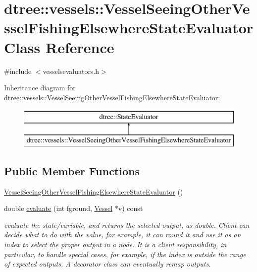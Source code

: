 \hypertarget{classdtree_1_1vessels_1_1_vessel_seeing_other_vessel_fishing_elsewhere_state_evaluator}{}\section{dtree\+::vessels\+::Vessel\+Seeing\+Other\+Vessel\+Fishing\+Elsewhere\+State\+Evaluator Class Reference}
\label{classdtree_1_1vessels_1_1_vessel_seeing_other_vessel_fishing_elsewhere_state_evaluator}


{\ttfamily \#include $<$vesselsevaluators.\+h$>$}

Inheritance diagram for dtree\+::vessels\+::Vessel\+Seeing\+Other\+Vessel\+Fishing\+Elsewhere\+State\+Evaluator\+:\begin{figure}[H]
\begin{center}
\leavevmode
\includegraphics[height=2.000000cm]{d0/d7b/classdtree_1_1vessels_1_1_vessel_seeing_other_vessel_fishing_elsewhere_state_evaluator}
\end{center}
\end{figure}
\subsection*{Public Member Functions}
\begin{DoxyCompactItemize}
\item 
\mbox{\hyperlink{classdtree_1_1vessels_1_1_vessel_seeing_other_vessel_fishing_elsewhere_state_evaluator_a5636c278d5ad17162b85049aa9da2dba}{Vessel\+Seeing\+Other\+Vessel\+Fishing\+Elsewhere\+State\+Evaluator}} ()
\item 
double \mbox{\hyperlink{classdtree_1_1vessels_1_1_vessel_seeing_other_vessel_fishing_elsewhere_state_evaluator_a76fa5431cd08865992d55357684cd7a2}{evaluate}} (int fground, \mbox{\hyperlink{class_vessel}{Vessel}} $\ast$v) const
\begin{DoxyCompactList}\small\item\em evaluate the state/variable, and returns the selected output, as double. Client can decide what to do with the value, for example, it can round it and use it as an index to select the proper output in a node. It is a client responsibility, in particular, to handle special cases, for example, if the index is outside the range of expected outputs. A decorator class can eventually remap outputs. \end{DoxyCompactList}\end{DoxyCompactItemize}


